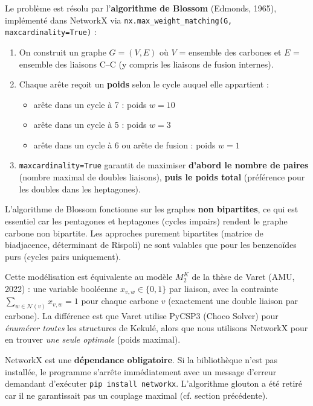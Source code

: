 \documentclass[a4paper,12pt]{article}
\begin{document}
Le problème est résolu par l'\textbf{algorithme de Blossom} (Edmonds, 1965), implémenté dans
NetworkX via \texttt{nx.max\_weight\_matching(G, maxcardinality=True)} :

\begin{enumerate}
  \item On construit un graphe $G = (V, E)$ où $V$ = ensemble des carbones et $E$ = ensemble
    des liaisons C--C (y compris les liaisons de fusion internes).
  \item Chaque arête reçoit un \textbf{poids} selon le cycle auquel elle appartient :
    \begin{itemize}
      \item arête dans un cycle à 7 : poids $w = 10$
      \item arête dans un cycle à 5 : poids $w = 3$
      \item arête dans un cycle à 6 ou arête de fusion : poids $w = 1$
    \end{itemize}
  \item \texttt{maxcardinality=True} garantit de maximiser \textbf{d'abord le nombre de paires}
    (nombre maximal de doubles liaisons), \textbf{puis le poids total} (préférence pour les
    doubles dans les heptagones).
\end{enumerate}

L'algorithme de Blossom fonctionne sur les graphes \textbf{non bipartites}, ce qui est essentiel
car les pentagones et heptagones (cycles impairs) rendent le graphe carbone non bipartite.
Les approches purement bipartites (matrice de biadjacence, déterminant de Rispoli) ne sont
valables que pour les benzenoïdes purs (cycles pairs uniquement).

\begin{remarque}
  Cette modélisation est équivalente au modèle $M_2^K$ de la thèse de Varet (AMU, 2022) :
  une variable booléenne $x_{v,w} \in \{0, 1\}$ par liaison, avec la contrainte
  $\sum_{w \in \mathcal{N}(v)} x_{v,w} = 1$ pour chaque carbone $v$ (exactement une double
  liaison par carbone). La différence est que Varet utilise PyCSP3 (Choco Solver) pour
  \textit{énumérer toutes} les structures de Kekulé, alors que nous utilisons NetworkX pour en
  trouver \textit{une seule optimale} (poids maximal).
\end{remarque}

\begin{attention}
  NetworkX est une \textbf{dépendance obligatoire}. Si la bibliothèque n'est pas installée,
  le programme s'arrête immédiatement avec un message d'erreur demandant d'exécuter
  \texttt{pip install networkx}. L'algorithme glouton a été retiré car il ne garantissait pas
  un couplage maximal (cf. section précédente).
\end{attention}
\end{document}
